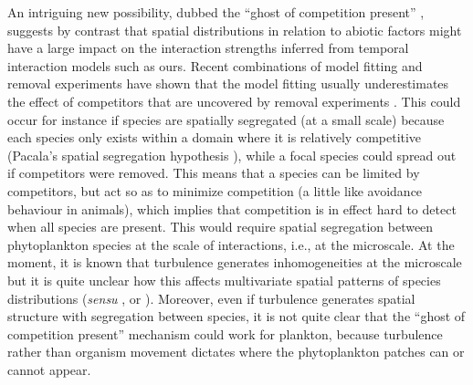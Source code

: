 \documentclass[10pt]{article}
\begin{document}
An intriguing new possibility, dubbed the ``ghost of competition
present'' \citep{tuck_strong_2018}, suggests by contrast that spatial
distributions in relation to abiotic factors might have a large impact
on the interaction strengths inferred from temporal interaction models
such as ours. Recent combinations of model fitting and removal experiments
have shown that the model fitting usually underestimates the effect
of competitors that are uncovered by removal experiments \citep{tuck_strong_2018,adler_weak_2018}.
This could occur for instance if species are spatially segregated
(at a small scale) because each species only exists within a domain
where it is relatively competitive (Pacala's spatial segregation hypothesis
\citealt{pacala1997biologically}), while a focal species could spread
out if competitors were removed. This means that a species can be
limited by competitors, but act so as to minimize competition (a little
like avoidance behaviour in animals), which implies that competition
is in effect hard to detect when all species are present. This would
require spatial segregation between phytoplankton species at the scale
of interactions, i.e., at the microscale. At the moment, it is known
that turbulence generates inhomogeneities at the microscale \citep{barton_impact_2014,breier_emergence_2018}
but it is quite unclear how this affects multivariate spatial patterns
of species distributions (\textit{sensu} \citealt{bolker_spatial_1999},
or \citealt{murrell_heteromyopia_2003}). Moreover, even if turbulence
generates spatial structure with segregation between species, it is
not quite clear that the ``ghost of competition present'' mechanism
could work for plankton, because turbulence rather than organism movement
dictates where the phytoplankton patches can or cannot appear.

\end{document}
